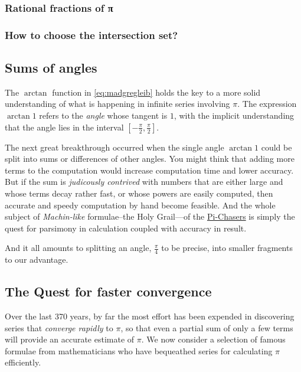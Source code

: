\documentclass[
  a4paper,
]{article}
\begin{document}
\subsubsection{Rational fractions of
π}\label{rational-fractions-of-ux3c0}

\subsubsection{How to choose the intersection
set?}\label{how-to-choose-the-intersection-set}

\subsection{Sums of angles}\label{sums-of-angles}

The \(\arctan\) function in \cref{eq:madgregleib} holds the key to a
more solid understanding of what is happening in infinite series
involving \(\pi\). The expression \(\arctan 1\) refers to the
\emph{angle} whose tangent is \(1\), with the implicit understanding
that the angle lies in the interval \([-\frac{\pi}{2}, \frac{\pi}{2}]\).

The next great breakthrough occurred when the single angle \(\arctan 1\)
could be split into sums or differences of other angles. You might think
that adding more terms to the computation would increase computation
time and lower accuracy. But if the sum is \emph{judicously contrived}
with numbers that are either large and whose terms decay rather fast, or
whose powers are easily computed, then accurate and speedy computation
by hand become feasible. And the whole subject of \emph{Machin-like}
formulae--the Holy Grail---of the \href{}{Pi-Chasers} is simply the
quest for parsimony in calculation coupled with accuracy in result.

And it all amounts to splitting an angle, \(\frac{\pi}{4}\) to be
precise, into smaller fragments to our advantage.

\subsection{The Quest for faster
convergence}\label{the-quest-for-faster-convergence}

Over the last 370 years, by far the most effort has been expended in
discovering series that \emph{converge rapidly} to \(\pi\), so that even
a partial sum of only a few terms will provide an accurate estimate of
\(\pi\). We now consider a selection of famous formulae from
mathematicians who have bequeathed series for calculating \(\pi\)
efficiently.
\end{document}
